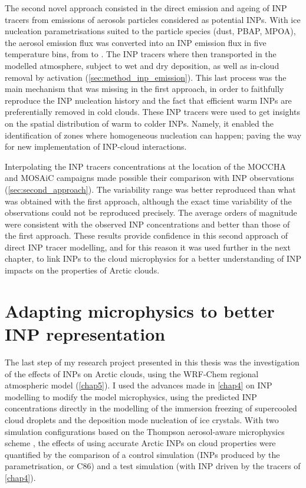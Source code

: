 The second novel approach consisted in the direct emission and ageing of INP tracers from emissions of aerosols particles considered as potential INPs.
With ice nucleation parametrisations suited to the particle species (dust, PBAP, MPOA), the aerosol emission flux was converted into an INP emission flux in five temperature bins, from  to . 
The INP tracers where then transported in the modelled atmosphere, subject to wet and dry deposition, as well as in-cloud removal by activation (\cref{sec:method_inp_emission}).
This last process was the main mechanism that was missing in the first approach, in order to faithfully reproduce the INP nucleation history and the fact that efficient warm INPs are preferentially removed in cold clouds.
These INP tracers were used to get insights on the spatial distribution of warm to colder INPs. Namely, it enabled the identification of zones where homogeneous nucleation can happen; paving the way for new implementation of INP-cloud interactions.

Interpolating the INP tracers concentrations at the location of the MOCCHA and MOSAiC campaigns made possible their comparison with INP observations (\cref{sec:second_approach}).
The variability range was better reproduced than what was obtained with the first approach, although the exact time variability of the observations could not be reproduced precisely.
The average orders of magnitude were consistent with the observed INP concentrations and better than those of the first approach.
These results provide confidence in this second approach of direct INP tracer modelling, and for this reason it was used further in the next chapter, to link INPs to the cloud microphysics for a better understanding of INP impacts on the properties of Arctic clouds. 

\section{Adapting microphysics to better INP representation}
The last step of my research project presented in this thesis was the investigation of the effects of INPs on Arctic clouds,  using the WRF-Chem regional atmospheric model (\cref{chap5}).
I used the advances made in \cref{chap4} on INP modelling to modify the model microphysics, using the predicted INP concentrations directly in the modelling of the immersion freezing of supercooled cloud droplets and the deposition mode nucleation of ice crystals. 
With two simulation configurations based on the Thompson aerosol-aware microphysics scheme \citep{thompson_study_2014}, the effects of using accurate Arctic INPs on cloud properties were quantified by the comparison of a control simulation (INPs produced by the \citet{cooper_ice_1986} parametrisation, or C86) and a test simulation (with INP driven by the tracers of \cref{chap4}).  %

